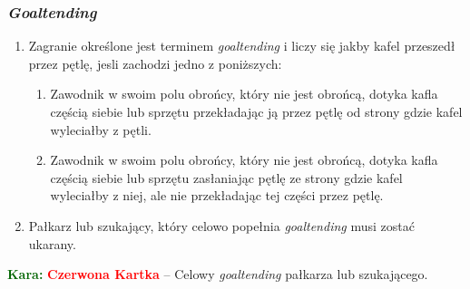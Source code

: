 \documentclass[11pt,a4paper]{article}
\newcommand\redcard[1]{\bgroup\textcolor{darkgreen}{\textbf{Kara: }}\bgroup\textcolor{red}{\textbf{Czerwona Kartka}} -- #1}
\begin{document}
\subsubsection{\emph{Goaltending}}
\begin{enumerate}
  \item Zagranie określone jest terminem \emph{goaltending} i liczy się jakby kafel przeszedł przez pętlę, jesli zachodzi jedno z poniższych:
  \begin{enumerate}
    \item Zawodnik w swoim polu obrońcy, który nie jest obrońcą, dotyka kafla częścią siebie lub sprzętu przekładając ją przez pętlę od strony gdzie kafel wyleciałby z pętli.
    \item Zawodnik w swoim polu obrońcy, który nie jest obrońcą, dotyka kafla częścią siebie lub sprzętu zasłaniając pętlę ze strony gdzie kafel wyleciałby z niej, ale nie przekładając tej części przez pętlę.
  \end{enumerate}
  \item Pałkarz lub szukający, który celowo popełnia \emph{goaltending} musi zostać ukarany.
\end{enumerate}

\redcard{Celowy \emph{goaltending} pałkarza lub szukającego.}

%
%
%
%
%
%

\newpage
\end{document}
